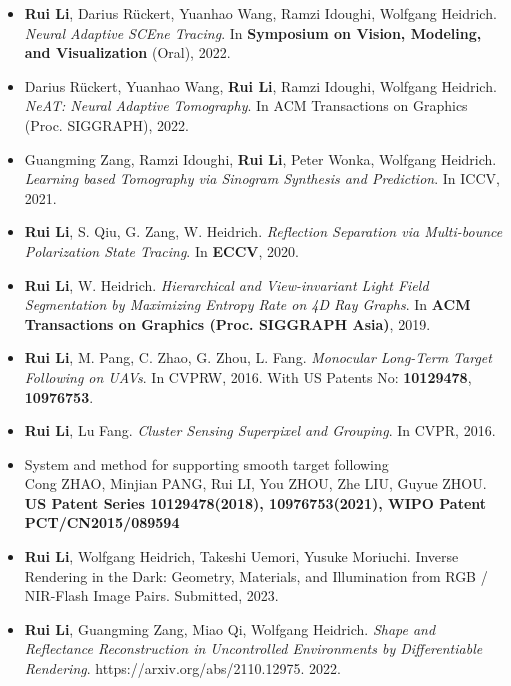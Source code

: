 \begin{itemize}
	\item \textbf{Rui Li}, Darius Rückert, Yuanhao Wang, Ramzi Idoughi, Wolfgang Heidrich. 
	\textit{Neural Adaptive SCEne Tracing}. In \textbf{Symposium on Vision, Modeling, and Visualization} (Oral), 2022. 
	\item Darius Rückert, Yuanhao Wang, \textbf{Rui Li}, Ramzi Idoughi, Wolfgang Heidrich. \textit{NeAT: Neural Adaptive Tomography}. In ACM Transactions on Graphics (Proc. SIGGRAPH),  2022. 
	\item Guangming Zang, Ramzi Idoughi, \textbf{Rui Li}, Peter Wonka, Wolfgang Heidrich. \textit{Learning based Tomography via Sinogram Synthesis and Prediction}. In ICCV, 2021. 
	\item \textbf{Rui Li}, S. Qiu, G. Zang, W. Heidrich. \textit{Reflection Separation via Multi-bounce Polarization State Tracing}. In \textbf{ECCV}, 2020. 
	\item \textbf{Rui Li}, W. Heidrich. \textit{Hierarchical and View-invariant Light Field Segmentation by Maximizing Entropy Rate on 4D Ray Graphs}. In \textbf{ACM Transactions on Graphics (Proc. SIGGRAPH Asia)}, 2019. 
	\item \textbf{Rui Li}, M. Pang, C. Zhao, G. Zhou, L. Fang. \textit{Monocular Long-Term Target Following on UAVs}. In CVPRW, 2016. With US Patents No: \textbf{10129478}, \textbf{10976753}.
	\item \textbf{Rui Li}, Lu Fang. \textit{Cluster Sensing Superpixel and Grouping}. In CVPR, 2016. 
\end{itemize}

\begin{itemize}
	\item  System and method for supporting smooth target following\\ 
	Cong ZHAO, Minjian PANG, Rui LI, You ZHOU, Zhe LIU, Guyue ZHOU. \\
	\textbf{US Patent Series 10129478(2018), 10976753(2021),
	WIPO Patent PCT/CN2015/089594}
\end{itemize}

\begin{itemize}
	\item \textbf{Rui Li}, Wolfgang Heidrich, Takeshi Uemori, Yusuke Moriuchi. Inverse Rendering in the Dark: Geometry, Materials, and Illumination from RGB / NIR-Flash Image Pairs. Submitted, 2023. 
	\item \textbf{Rui Li}, Guangming Zang, Miao Qi, Wolfgang Heidrich. \textit{Shape and Reflectance Reconstruction in Uncontrolled Environments by Differentiable Rendering}. https://arxiv.org/abs/2110.12975. 2022. 
\end{itemize}





